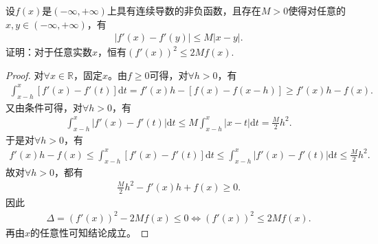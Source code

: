 \documentclass[../../main.tex]{subfiles}%
\begin{document}
\begin{example}
设$f(x)$是$(-\infty,+\infty)$上具有连续导数的非负函数，且存在$M > 0$使得对任意的$x,y \in (-\infty,+\infty)$，有
\begin{align*}
|f'(x) - f'(y)| \leqslant M|x - y|.
\end{align*}
证明：对于任意实数$x$，恒有$(f'(x))^2 \leqslant 2Mf(x)$.
\end{example}
\begin{proof}

对$\forall x \in \mathbb{R}$，固定$x$。由$f \geqslant 0$可得，对$\forall h > 0$，有
\begin{align*}
\int_{x-h}^x [f'(x) - f'(t)] \mathrm{d}t = f'(x)h - [f(x) - f(x - h)] \geqslant f'(x)h - f(x).
\end{align*}
又由条件可得，对$\forall h > 0$，有
\begin{align*}
\int_{x-h}^x |f'(x) - f'(t)| \mathrm{d}t \leqslant M \int_{x-h}^x |x - t| \mathrm{d}t = \frac{M}{2}h^2.
\end{align*}
于是对$\forall h > 0$，有
\begin{align*}
f'(x)h - f(x) \leqslant \int_{x-h}^x [f'(x) - f'(t)] \mathrm{d}t \leqslant \int_{x-h}^x |f'(x) - f'(t)| \mathrm{d}t \leqslant \frac{M}{2}h^2.
\end{align*}
故对$\forall h > 0$，都有
\begin{align*}
\frac{M}{2}h^2 - f'(x)h + f(x) \geqslant 0.
\end{align*}
因此
\begin{align*}
\Delta = (f'(x))^2 - 2Mf(x) \leqslant 0 \Longleftrightarrow (f'(x))^2 \leqslant 2Mf(x).
\end{align*}
再由$x$的任意性可知结论成立。

\end{proof}
\end{document}
